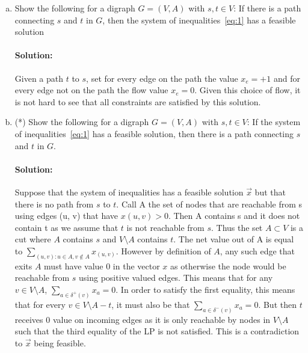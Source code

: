 \documentclass[11pt]{article}
\begin{document}
\begin{enumerate}[a)]
    
    
\item Show the following for a digraph $G = (V,A)$ with $s,t ∈ V$: If there is a path connecting $s$ and $t$ in $G$, then the system of inequalities~\eqref{eq:1} has a feasible solution


\paragraph{Solution:}
Given a path $t$ to $s$, set for every edge on the path the value $x_e = +1$ and for every edge not on the path the flow value $x_e = 0$. Given this choice of flow, it is not hard to see that all constraints are satisfied by this solution. 


  \item (*)  Show the following for a digraph $G = (V,A)$ with $s,t ∈ V$: If  the system of inequalities~\eqref{eq:1} has a feasible solution, then  there is a path connecting $s$ and $t$ in $G$. 
  
  
  \paragraph{Solution:}
  Suppose that the system of inequalities has a feasible solution $\vec{x}$ but that there is no path from $s$ to $t$. Call A the set of nodes that are reachable from s using edges (u, v) that have $x(u, v) > 0$. Then A contains s and it does not
contain t as we assume that $t$ is not reachable from $s$. Thus the set $A \subset V$ is a cut where $A$ contains $s$ and $V \setminus A$ contains $t$. The net value out of A is equal to $\sum_{(u,v): u \in A, v \notin A} x_{(u, v)}$. However by definition of $A$, any such edge that exits $A$ must have value $0$ in the vector $x$ as otherwise the node would be reachable from $s$ using positive valued edges. This means that for any $v \in V \setminus A$, $\sum_{a \in \delta^+(v)} x_a = 0$. In order to satisfy the first equality, this means that for every $v \in V \setminus A - t$, it must also be that $\sum_{a \in \delta^-(v)} x_a = 0$. But then $t$ receives $0$ value on incoming edges as it is only reachable by nodes in $V \setminus A$ such that the third equality of the LP is not satisfied. This is a contradiction to $\vec{x}$ being feasible. 
  
   \end{enumerate}
  
\end{document}
